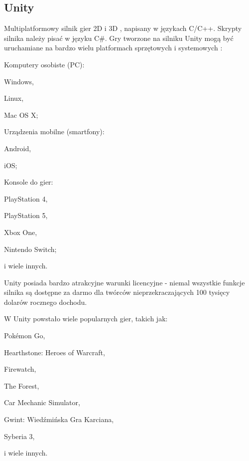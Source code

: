 \subsection{Unity}
Multiplatformowy silnik gier 2D i 3D \cite{unity:opis}, napisany w językach C/C++.
Skrypty silnika należy pisać w języku C\#.
Gry tworzone na silniku Unity mogą być uruchamiane na bardzo wielu platformach sprzętowych i systemowych \cite{unity:buildTargets}:
\begin{enumerate*}
\item Komputery osobiste (PC):
\begin{itemize*}
\item Windows,
\item Linux,
\item Mac OS X;
\end{itemize*}
\item Urządzenia mobilne (smartfony):
\begin{itemize*}
\item Android,
\item iOS;
\end{itemize*}
\item Konsole do gier:
\begin{itemize*}
\item PlayStation 4,
\item PlayStation 5,
\item Xbox One,
\item Nintendo Switch;
\end{itemize*}
\item i wiele innych.
\end{enumerate*}

Unity posiada bardzo atrakcyjne warunki licencyjne - niemal wszystkie funkcje silnika są dostępne za darmo dla twórców nieprzekraczających 100 tysięcy dolarów rocznego dochodu.

W Unity powstało wiele popularnych gier, takich jak:
\begin{enumerate*}
\item Pokémon Go,
\item Hearthstone: Heroes of Warcraft,
\item Firewatch,
\item The Forest,
\item Car Mechanic Simulator,
\item Gwint: Wiedźmińska Gra Karciana,
\item Syberia 3,
\item i wiele innych.
\end{enumerate*}


